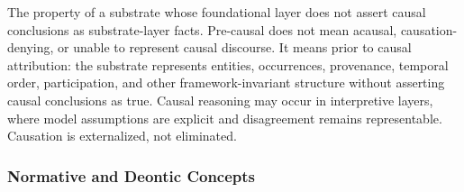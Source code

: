 \begin{description}[style=nextline,leftmargin=1.5cm]
\item[Pre-Causal]
The property of a substrate whose foundational layer
does not assert causal conclusions as substrate-layer facts.
Pre-causal does not mean acausal, causation-denying,
or unable to represent causal discourse.
It means prior to causal attribution:
the substrate represents entities, occurrences,
provenance, temporal order, participation,
and other framework-invariant structure
without asserting causal conclusions as true.
Causal reasoning may occur in interpretive layers,
where model assumptions are explicit
and disagreement remains representable.
Causation is externalized, not eliminated.

\end{description}

\subsubsection*{Normative and Deontic Concepts}

